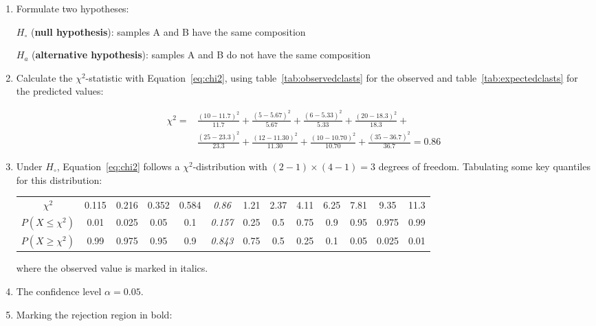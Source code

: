 \begin{enumerate}
\item  Formulate two hypotheses:

  $H_\circ$ (\textbf{null hypothesis}): samples A and B have the same composition

  $H_a$ (\textbf{alternative hypothesis}):
  samples A and B do not have the same composition
  
\item Calculate the $\chi^2$-statistic with Equation~\ref{eq:chi2},
  using table~\ref{tab:observedclasts} for the observed and
  table~\ref{tab:expectedclasts} for the predicted values:
  
  \begin{equation}
    \begin{split}
      \chi^2 = &
      \frac{(10-11.7)^2}{11.7} + \frac{(5-5.67)^2}{5.67} +
      \frac{(6-5.33)^2}{5.33} + \frac{(20-18.3)^2}{18.3} + \\
      & \frac{(25-23.3)^2}{23.3} + \frac{(12-11.30)^2}{11.30} +
      \frac{(10-10.70)^2}{10.70} + \frac{(35-36.7)^2}{36.7} = 0.86
    \end{split}
  \end{equation}

\item Under $H_\circ$, Equation~\ref{eq:chi2} follows a
  $\chi^2$-distribution with $(2-1)\times(4-1)=3$ degrees of
  freedom. Tabulating some key quantiles for this distribution:

  \begin{center}
    \begin{tabular}{c|c@{\gap}c@{\gap}c@{\gap}c@{\gap}
        c@{\gap}c@{\gap}c@{\gap}c@{\gap}c@{\gap}c@{\gap}c@{\gap}c}
      $\chi^2$ & 0.115 & 0.216 & 0.352 & 0.584 & \emph{0.86} &
      1.21 & 2.37 & 4.11 & 6.25 & 7.81 & 9.35 & 11.3 \\
      $P(X\leq{\chi^2})$ & 0.01 & 0.025 & 0.05 & 0.1 & \emph{0.157} &
      0.25 & 0.5 & 0.75 & 0.9 & 0.95 & 0.975 & 0.99 \\
      $P(X\geq{\chi^2})$ & 0.99 & 0.975 & 0.95 & 0.9 & \emph{0.843} & 
      0.75 & 0.5 & 0.25 & 0.1 & 0.05 & 0.025 & 0.01
    \end{tabular}
  \end{center}

  \noindent where the observed value is marked in italics.
  
\item The confidence level $\alpha = 0.05$.

\item Marking the rejection region in bold:
  

\end{enumerate}
